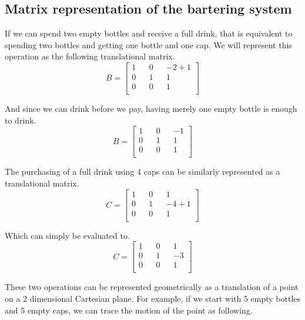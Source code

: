\documentclass[letterpaper, 12pt]{article}
\begin{document}
\subsection{Matrix representation of the bartering system}
\par If we can spend two empty bottles and receive a full drink, that is equivalent to spending two bottles and getting one bottle and one cap.
We will represent this operation as the following translational matrix.
\[
	B=
	\begin{bmatrix}
		1 && 0 && -2 + 1\\
		0 && 1 &&  1\\
		0 && 0 &&  1\\
	\end{bmatrix}
\]
\par And since we can drink before we pay, having merely one empty bottle is enough to drink.
\[
	B=
	\begin{bmatrix}
		1 && 0 && -1\\
		0 && 1 &&  1\\
		0 && 0 &&  1\\
	\end{bmatrix}
\]
\par The purchasing of a full drink using 4 caps can be similarly represented as a translational matrix.
\[
	C=
	\begin{bmatrix}
		1 && 0 &&  1\\
		0 && 1 && -4 + 1\\
		0 && 0 &&  1\\
	\end{bmatrix}
\]
\par Which can simply be evaluated to.
\[
	C=
	\begin{bmatrix}
		1 && 0 &&  1\\
		0 && 1 && -3\\
		0 && 0 &&  1\\
	\end{bmatrix}
\]
\par These two operations can be represented geometrically as a translation of a point on a 2 dimensional Cartesian plane.
For example, if we start with 5 empty bottles and 5 empty caps, we can trace the motion of the point as following.
\begin{center}
\end{center}
\end{document}
